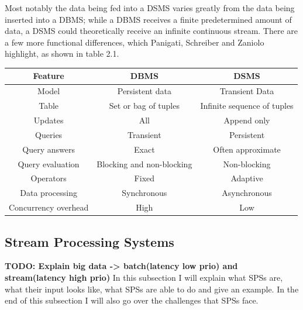         Most notably the data being fed into a DSMS varies greatly from the data being inserted into a DBMS; while a DBMS receives a finite predetermined amount 
        of data, a DSMS could theoretically receive an infinite continuous stream.
        There are a few more functional differences, which Panigati, Schreiber and Zaniolo highlight, as shown in table 2.1.

        \begin{table}[h]
            \centering
            \label{tab:dbms-dsms}
            \begin{tabular}{|c|c|c|} \hline
                \textbf{Feature} & \textbf{DBMS} & \textbf{DSMS} \\ \hline
                Model & Persistent data & Transient Data \\ \hline
                Table & Set or bag of tuples & Infinite sequence of tuples \\ \hline
                Updates & All & Append only \\ \hline
                Queries & Transient & Persistent \\ \hline
                Query answers & Exact & Often approximate \\ \hline
                Query evaluation & Blocking and non-blocking & Non-blocking \\ \hline
                Operators & Fixed & Adaptive \\ \hline
                Data processing & Synchronous & Asynchronous \\ \hline
                Concurrency overhead  & High & Low \\ \hline
            \end{tabular}
        \end{table}

        \subsection{Stream Processing Systems}
        \label{sub:sps}
        \textbf{TODO: Explain big data -> batch(latency low prio) and stream(latency high prio) }
        In this subsection I will explain what SPSs are, what their input looks like, what SPSs are able to do and give an example.
        In the end of this subsection I will also go over the challenges that SPSs face.

